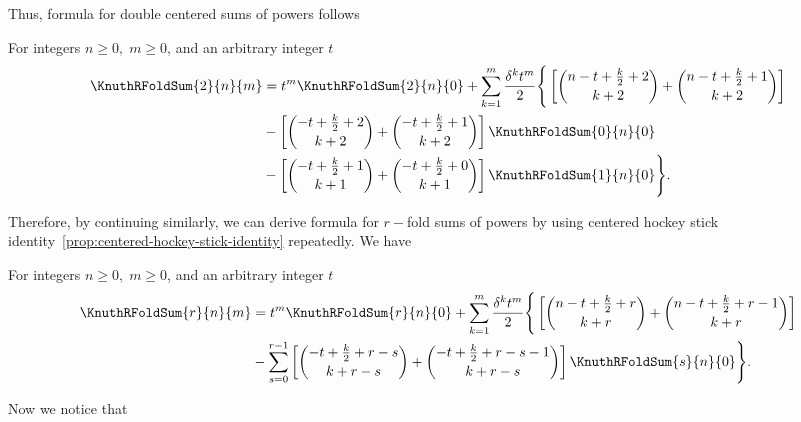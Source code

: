Thus, formula for double centered sums of powers follows
\begin{proposition}
  \label{prop:double-centered-sums-of-powers}
  For integers $n\geq 0, \; m \geq 0$, and an arbitrary integer $t$
  \begin{align*}
    \KnuthRFoldSum{2}{n}{m}
    &=  t^m \KnuthRFoldSum{2}{n}{0}
    + \sum_{k=1}^{m} \frac{\delta^{k} t^m}{2}
    \Bigg \{
      \left[
        \binom{n-t+\frac{k}{2} + 2}{k+2}
        +
        \binom{n-t+\frac{k}{2} + 1}{k+2}
      \right] \\
      &-
      \left[
        \binom{-t+\frac{k}{2}+2}{k+2}
        +
        \binom{-t+\frac{k}{2} + 1}{k+2}
      \right] \KnuthRFoldSum{0}{n}{0} \\
      &-
      \left[
        \binom{-t+\frac{k}{2}+1}{k+1}
        +
        \binom{-t+\frac{k}{2}+0}{k+1}
      \right] \KnuthRFoldSum{1}{n}{0}
    \Bigg \}.
  \end{align*}
\end{proposition}
Therefore, by continuing similarly,
we can derive formula for $r-$fold sums of powers
by using centered hockey stick
identity~\eqref{prop:centered-hockey-stick-identity} repeatedly.
We have
\begin{theorem}
  \label{theorem:multifold-centered-sums-of-powers}
  For integers $n\geq 0, \; m \geq 0$, and an arbitrary integer $t$
  \begin{align*}
    \KnuthRFoldSum{r}{n}{m}
    &= t^m \KnuthRFoldSum{r}{n}{0}
    + \sum_{k=1}^{m} \frac{\delta^{k} t^{m}}{2}
    \Bigg \{
      \left[
        \binom{n-t+\frac{k}{2}+r}{k+r}
        +
        \binom{n-t+\frac{k}{2}+r-1}{k+r}
      \right] \\
      &-
      \sum_{s=0}^{r-1}
      \left[
        \binom{-t+\frac{k}{2} + r -s}{k+r-s} +
        \binom{-t+\frac{k}{2} + r -s-1}{k+r-s}
      \right] \KnuthRFoldSum{s}{n}{0}
    \Bigg \}.
  \end{align*}
\end{theorem}
Now we notice that
